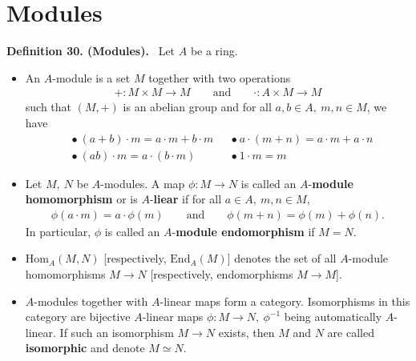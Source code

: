 \documentclass[12pt,a4paper,footinclude=true,headinclude=true]{scrbook} %
\newenvironment{definition}[2][Definition]
    { \begin{mdframed}[backgroundcolor=gray!20] \textbf{#1 #2.}\ }
    {  \end{mdframed}}
\begin{document}
\section{Modules}
\begin{definition}{30. (Modules)}
    Let $A$ be a ring.
    \begin{itemize}
        \item An $A$-module is a set $M$ together with two operations
        \begin{align*}
            +:M\times M\to M\qquad\text{and}\qquad \cdot:A\times M\to M
        \end{align*}
        such that $(M,+)$ is an abelian group and for all $a,b\in A,\ m,n\in M$, we have
        \begin{align*}
            &\bullet\ (a+b)\cdot m=a\cdot m+b\cdot m
            &&\bullet\ a\cdot(m+n)=a\cdot m+a\cdot n \\
            &\bullet\ (ab)\cdot m=a\cdot(b\cdot m) &&\bullet\ 1\cdot m=m
        \end{align*}
        \item Let $M,\ N$ be $A$-modules. A map $\phi:M\to N$ is called an $A$-\textbf{module homomorphism} or is $A$-\textbf{liear} if for all $a\in A,\ m,n\in M$, 
        \begin{align*}
            \phi(a\cdot m)=a\cdot\phi(m)\qquad\text{and}\qquad
            \phi(m+n)=\phi(m)+\phi(n).
        \end{align*}
        In particular, $\phi$ is called an $A$-\textbf{module endomorphism} if $M=N$.
        \item $\mathrm{Hom}_A(M,N)$ [respectively, $\mathrm{End}_A(M)$] denotes the set of all $A$-module homomorphisms $M\to N$ [respectively, endomorphisms $M\to M$].
        \item $A$-modules together with $A$-linear maps form a category. Isomorphisms in this category are bijective $A$-linear maps $\phi:M\to N,\ \phi^{-1}$ being automatically $A$-linear. If such an isomorphism $M\to N$ exists, then $M$ and $N$ are called \textbf{isomorphic} and denote $M\simeq N$.
    \end{itemize}
\end{definition}
\end{document}
